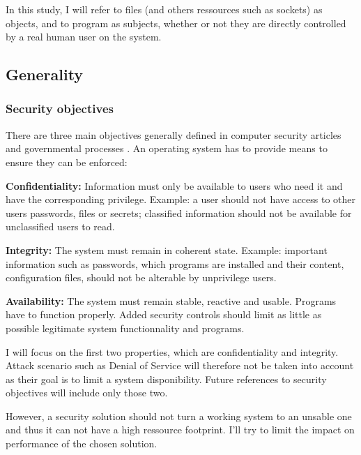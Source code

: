 \documentclass[pdftex,a4paper,titlepage,11pt]{article}
\begin{document}
\bigskip

In this study, I will refer to files (and others ressources such as sockets) as
objects, and to program as subjects, whether or not they are directly
controlled by a real human user on the system.

\subsection{Generality}

\subsubsection{Security objectives}

There are three main objectives generally defined in computer security articles
and governmental processes \cite{tcsec1986}. An operating system has to provide
means to ensure they can be enforced:

\bigskip

\textbf{Confidentiality:}
Information must only be available to users who need it and have the
corresponding privilege. Example: a user should not have access to other users
passwords, files or secrets; classified information should not be available for
unclassified users to read.

\medskip

\textbf{Integrity:}
The system must remain in coherent state. Example: important information such
as passwords, which programs are installed and their content, configuration
files, should not be alterable by unprivilege users.

\medskip

\textbf{Availability:}
The system must remain stable, reactive and usable. Programs have to function
properly. Added security controls should limit as little as possible legitimate
system functionnality and programs.

\bigskip

I will focus on the first two properties, which are confidentiality and
integrity. Attack scenario such as Denial of Service will therefore not be
taken into account as their goal is to limit a system disponibility. Future
references to security objectives will include only those two.

\bigskip

However, a security solution should not turn a working system to an unsable one
and thus it can not have a high ressource footprint. I'll try to limit the
impact on performance of the chosen solution.
\end{document}
